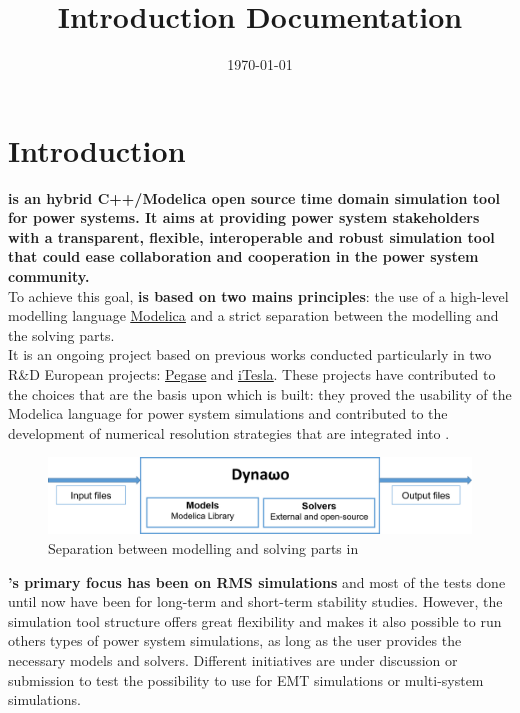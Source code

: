 \documentclass[a4paper, 12pt]{report}
\begin{document}
\title{\Dynawo Introduction Documentation}
\date\today

\maketitle
\tableofcontents

\chapter{Introduction}

\textbf{\Dynawo is an hybrid C++/Modelica open source time domain simulation tool for power systems. It aims at providing power system stakeholders with a transparent, flexible, interoperable and robust simulation tool that could ease collaboration and cooperation in the power system community.} \\

To achieve this goal, \textbf{\Dynawo is based on two mains principles}: the use of a high-level modelling language \href{https://modelica.org/} {\underline{Modelica}} and a strict separation between the modelling and the solving parts. \\

It is an ongoing project based on previous works conducted particularly in two R\&D European projects: \href{http://www.fp7-pegase.com/}{\underline{Pegase}} and \href{http://www.itesla-project.eu/}{\underline{iTesla}}. These projects have contributed to the choices that are the basis upon which \Dynawo is built: they proved the usability of the Modelica language for power system simulations and contributed to the development of numerical resolution strategies that are integrated into \Dynawo. \\

\begin{figure}[h!]
\centering
\includegraphics[width=\textwidth]{../resources/DynawoModelSolverLight.png}
\caption{Separation between modelling and solving parts in \Dynawo}
\end{figure}


\textbf{\Dynawo 's primary focus has been on RMS simulations} and most of the
tests done until now have been for long-term and short-term stability studies.
However, the simulation tool structure offers great flexibility and makes it
also possible to run others types of power system simulations, as long as the
user provides the necessary models and solvers. Different initiatives are under discussion or submission to test the possibility to use \Dynawo for EMT simulations or multi-system simulations. \\
\end{document}
